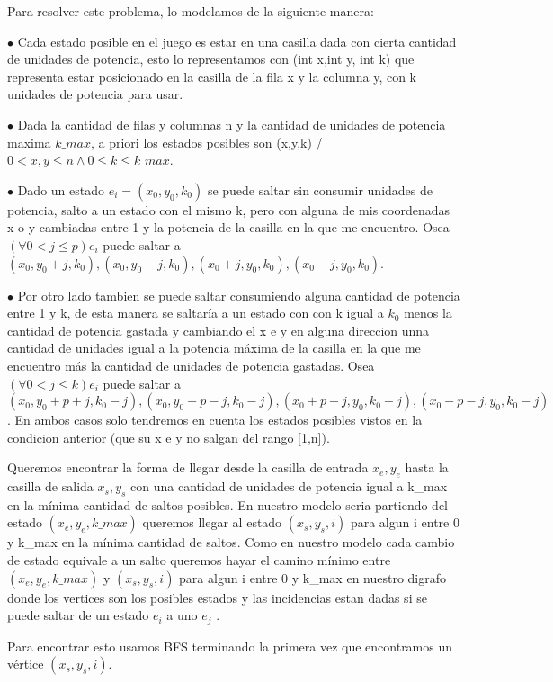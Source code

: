 Para resolver este problema, lo modelamos de la siguiente manera:

$\bullet$ Cada estado posible en el juego es estar en una casilla dada con cierta cantidad de unidades de potencia, esto lo representamos con (int x,int y, int k) que representa estar posicionado en la casilla de la fila x y la columna y, con k unidades de potencia para usar.

$\bullet$ Dada la cantidad de filas y columnas n y la cantidad de unidades de potencia maxima $k\_max$, a priori los estados posibles son (x,y,k) / $0 < x,y \leq n \wedge 0 \leq k \leq k\_max$. 

$\bullet$ Dado un estado $e_i = (x_0,y_0,k_0)$ se puede saltar sin consumir unidades de potencia, salto a un estado con el mismo k, pero con alguna de mis coordenadas x o y cambiadas entre 1 y la potencia de la casilla en la que me encuentro. Osea  $(\forall 0 < j \leq p ) e_i$ puede saltar a $(x_0,y_0+j,k_0), (x_0,y_0-j,k_0), (x_0+j,y_0,k_0), (x_0-j,y_0,k_0)$.

$\bullet$ Por otro lado tambien se puede saltar consumiendo alguna cantidad de potencia entre 1 y k, de esta manera se saltaría a un estado con con k igual a $k_0$ menos la cantidad de potencia gastada y cambiando el x e y en alguna direccion unna cantidad de unidades igual a la potencia máxima de la casilla en la que me encuentro más la cantidad de unidades de potencia gastadas. Osea $(\forall 0 < j \leq k ) e_i$ puede saltar a $(x_0,y_0+p+j,k_0-j), (x_0,y_0-p-j,k_0-j), (x_0+p+j,y_0,k_0-j), (x_0-p-j,y_0,k_0-j)$. En ambos casos solo tendremos en cuenta los estados posibles vistos en la condicion anterior (que su x e y no salgan del rango [1,n]).

Queremos encontrar la forma de llegar desde la casilla de entrada $x_e,y_e$ hasta la casilla de salida $x_s,y_s$ con una cantidad de unidades de potencia igual a k\_max en la mínima cantidad de saltos posibles. En nuestro modelo seria partiendo del estado $(x_e,y_e,k\_max)$ queremos llegar al estado $(x_s,y_s,i)$ para algun i entre 0 y k\_max en la mínima cantidad de saltos. Como en nuestro modelo cada cambio de estado equivale a un salto queremos hayar el camino mínimo entre $(x_e,y_e,k\_max)$ y $(x_s,y_s,i)$ para algun i entre 0 y k\_max en nuestro digrafo donde los vertices son los posibles estados y las incidencias estan dadas si se puede saltar de un estado $e_i$ a uno $e_j$ .

Para encontrar esto usamos BFS terminando la primera vez que encontramos un vértice $(x_s,y_s,i)$.




